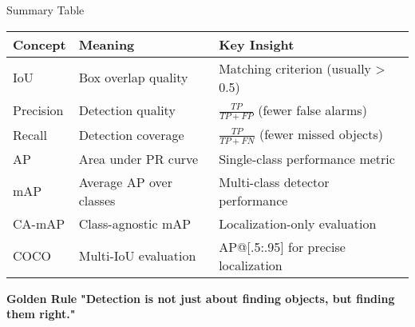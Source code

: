 \documentclass[usenames,dvipsnames]{beamer}
\begin{document}
\begin{frame}{Summary Table}
	\begin{center}
	\begin{tabular}{|l|l|l|}
	\hline
	\textbf{Concept} & \textbf{Meaning} & \textbf{Key Insight} \\
	\hline
	IoU & Box overlap quality & Matching criterion (usually > 0.5) \\
	\hline
	Precision & Detection quality & $\frac{TP}{TP + FP}$ (fewer false alarms) \\
	\hline
	Recall & Detection coverage & $\frac{TP}{TP + FN}$ (fewer missed objects) \\
	\hline
	AP & Area under PR curve & Single-class performance metric \\
	\hline
	mAP & Average AP over classes & Multi-class detector performance \\
	\hline
	CA-mAP & Class-agnostic mAP & Localization-only evaluation \\
	\hline
	COCO & Multi-IoU evaluation & AP@[.5:.95] for precise localization \\
	\hline
	\end{tabular}
	\end{center}
	
	\vspace{1em}
	\begin{keypointsbox}
	\textbf{Golden Rule}
	\textbf{"Detection is not just about finding objects, but finding them right."}
	\end{keypointsbox}
\end{frame}
\end{document}
